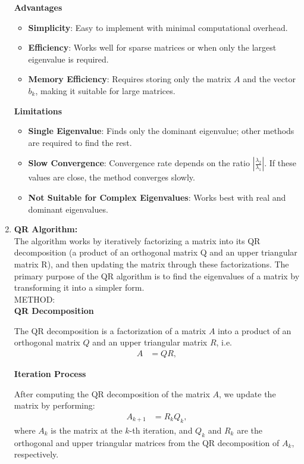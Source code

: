 \documentclass[journal]{IEEEtran}
\begin{document}
\begin{enumerate}
\textbf{Advantages}
\begin{itemize}
    \item \textbf{Simplicity}: Easy to implement with minimal computational overhead.
    \item \textbf{Efficiency}: Works well for sparse matrices or when only the largest eigenvalue is required.
    \item \textbf{Memory Efficiency}: Requires storing only the matrix $A$ and the vector $b_k$, making it suitable for large matrices.
\end{itemize}

\textbf{Limitations}
\begin{itemize}
    \item \textbf{Single Eigenvalue}: Finds only the dominant eigenvalue; other methods are required to find the rest.
    \item \textbf{Slow Convergence}: Convergence rate depends on the ratio $\left| \frac{\lambda_2}{\lambda_1} \right|$. If these values are close, the method converges slowly.
    \item \textbf{Not Suitable for Complex Eigenvalues}: Works best with real and dominant eigenvalues.
\end{itemize}

 \item \textbf{QR Algorithm:} \\
 The algorithm works by iteratively factorizing a matrix into its QR decomposition (a product of an orthogonal matrix Q and an upper triangular matrix R), and then updating the matrix through these factorizations. The primary purpose of the QR algorithm is to find the eigenvalues of a matrix by transforming it into a simpler form.\\
 METHOD: \\
 \textbf{QR Decomposition}

The QR decomposition is a factorization of a matrix $A$ into a product of an orthogonal matrix $Q$ and an upper triangular matrix $R$, i.e.
\begin{align}
A &= QR, 
\end{align}

\textbf{Iteration Process}

After computing the QR decomposition of the matrix $A$, we update the matrix by performing:
\begin{align}
A_{k+1} &= R_k Q_k,
\end{align}
where $A_k$ is the matrix at the $k$-th iteration, and $Q_k$ and $R_k$ are the orthogonal and upper triangular matrices from the QR decomposition of $A_k$, respectively.


\end{enumerate}
\end{document}
